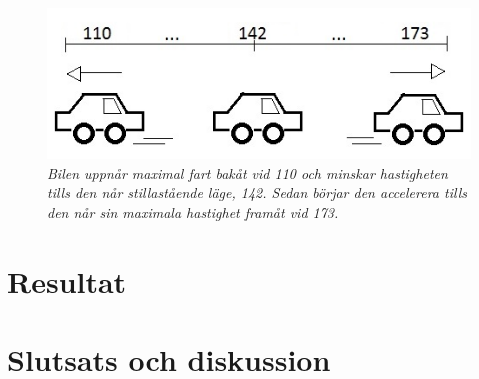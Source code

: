 \documentclass[a4paper]{article}
\begin{document}
\begin{figure}[H]
\includegraphics[scale=1]{110-173Car.jpg}
\centering
\caption{\it Bilen uppnår maximal fart bakåt vid 110 och minskar hastigheten tills den når stillastående läge, 142. Sedan börjar den accelerera tills den når sin maximala hastighet framåt vid 173.}
\end{figure} 









\newpage
\section{Resultat}






\newpage
\section{Slutsats och diskussion}



\newpage


\end{document}
